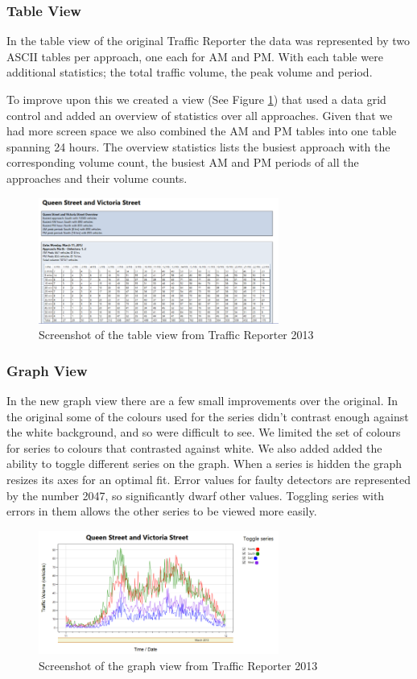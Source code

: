 \documentclass{article}
\begin{document}
\subsubsection{Table View}
In the table view of the original Traffic Reporter the data was represented by two ASCII tables per approach, one each for AM and PM. With each table were additional statistics; the total traffic volume, the peak volume and period. 

To improve upon this we created a view (See Figure \ref{fig:newTable}) that used a data grid control and added an overview of statistics over all approaches. Given that we had more screen space we also combined the AM and PM tables into one table spanning 24 hours.
The overview statistics lists the busiest approach with the corresponding volume count, the busiest AM and PM periods of all the approaches and their volume counts.

\begin{figure}[!t]
\centerline{\includegraphics[width=3.1in]{newTable}}
\caption{Screenshot of the table view from Traffic Reporter 2013}
\label{fig:newTable}
\end{figure}

\subsubsection{Graph View}
In the new graph view there are a few small improvements over the original. In the original some of the colours used for the series didn't contrast enough against the white background, and so were difficult to see. We limited the set of colours for series to colours that contrasted against white. We also added added the ability to toggle different series on the graph. When a series is hidden the graph resizes its axes for an optimal fit. Error values for faulty detectors are represented by the number 2047, so significantly dwarf other values. Toggling series with errors in them allows the other series to be viewed more easily.

\begin{figure}[!t]
\centerline{\includegraphics[width=3.1in]{newGraph}}
\caption{Screenshot of the graph view from Traffic Reporter 2013}
\label{fig:newGraph}
\end{figure}
\end{document}
